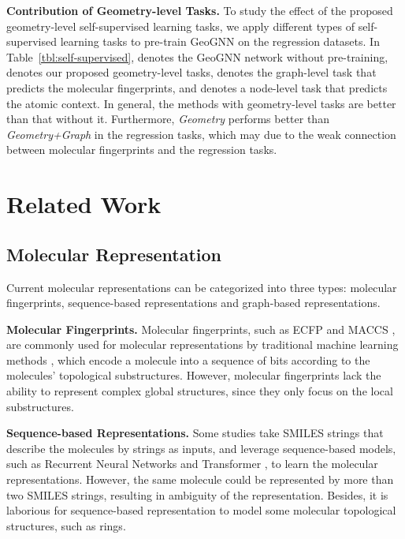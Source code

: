 \documentclass{article}
\begin{document}
\textbf{Contribution of Geometry-level Tasks.}
To study the effect of the proposed geometry-level self-supervised learning tasks, we apply different types of self-supervised learning tasks to pre-train GeoGNN on the regression datasets. In Table~\ref{tbl:self-supervised},  denotes the GeoGNN network without pre-training,  denotes our proposed geometry-level tasks,  denotes the graph-level task that predicts the molecular fingerprints, and  \cite{DBLP:conf/nips/RongBXX0HH20} denotes a node-level task that predicts the atomic context. In general, the methods with geometry-level tasks are better than that without it. Furthermore, \textit{Geometry} performs better than \textit{Geometry+Graph} in the regression tasks, which may due to the weak connection between molecular fingerprints and the regression tasks.


\section{Related Work}
\subsection{Molecular Representation}
Current molecular representations can be categorized into three types: molecular fingerprints, sequence-based representations and graph-based representations.

\textbf{Molecular Fingerprints.} Molecular fingerprints, such as ECFP \cite{DBLP:journals/jcisd/RogersH10} and MACCS \cite{DBLP:journals/jcisd/DurantLHN02}, are commonly used for molecular representations by traditional machine learning methods \cite{cereto2015molecular,coley2017convolutional,DBLP:conf/nips/DuvenaudMABHAA15,DBLP:journals/corr/abs-2004-08919}, which encode a molecule into a sequence of bits according to the molecules' topological substructures. However, molecular fingerprints lack the ability to represent complex global structures, since they only focus on the local substructures.

\textbf{Sequence-based Representations.}
Some studies \cite{goh2018smiles2vec,DBLP:journals/corr/abs-2004-08919} take SMILES strings \cite{DBLP:journals/jcisd/Weininger88} that describe the molecules by strings as inputs, and leverage sequence-based models, such as Recurrent Neural Networks and Transformer \cite{DBLP:journals/corr/ZarembaSV14,vaswani2017attention}, to learn the molecular representations.
However, the same molecule could be represented by more than two SMILES strings, resulting in ambiguity of the representation. Besides, it is laborious for sequence-based representation to model some molecular topological structures, such as rings.
\end{document}

